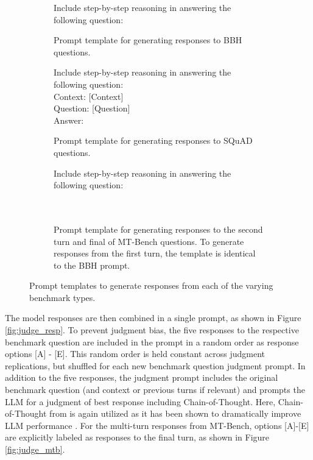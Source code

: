 \documentclass[11pt]{article}
\begin{document}
\begin{figure}[h]
\centering
\begin{subfigure}[b]{0.49\textwidth}
\begin{tcolorbox}
Include step-by-step reasoning in answering the
following question: \\
\text{[Question]}
\end{tcolorbox}
\caption{Prompt template for generating responses to BBH questions.}
\label{fig:prompt_bbh}
\end{subfigure}
\hfill
\begin{subfigure}[b]{0.5\textwidth}
\begin{tcolorbox}
Include step-by-step reasoning in answering the following question: \\
Context: [Context] \\
Question: [Question] \\
Answer: 
\end{tcolorbox}
\caption{Prompt template for generating responses to SQuAD questions.}
\label{fig:prompt_squad}
\end{subfigure}
\begin{subfigure}[b]{0.5\textwidth}
\begin{tcolorbox}
Include step-by-step reasoning in answering the following question: \\
\text{[Question 1]} \\
\text{[Response 1]} \\
\text{[Question 2]}
\end{tcolorbox}
\caption{Prompt template for generating responses to the second turn and final of MT-Bench questions. To generate responses from the first turn, the template is identical to the BBH prompt.}
\label{fig:prompt_mtb}
\end{subfigure}
\caption{Prompt templates to generate responses from each of the varying benchmark types.}
\label{fig:prompt_resp}
\end{figure}


The model responses are then combined in a single prompt, as shown in Figure \ref{fig:judge_resp}. To prevent judgment bias, the five responses to the respective benchmark question are included in the prompt in a random order as response options [A] - [E]. This random order is held constant across judgment replications, but shuffled for each new benchmark question judgment prompt. In addition to the five responses, the judgment prompt includes the original benchmark question (and context or previous turns if relevant) and prompts the LLM for a judgment of best response including Chain-of-Thought. Here, Chain-of-Thought from \citet{wei2022chain} is again utilized as it has been shown to dramatically improve LLM performance \citet{feng2024towards, suzgun2022challenging, chu2023survey}. For the multi-turn responses from MT-Bench, options [A]-[E] are explicitly labeled as responses to the final turn, as shown in Figure \ref{fig:judge_mtb}.
\end{document}
